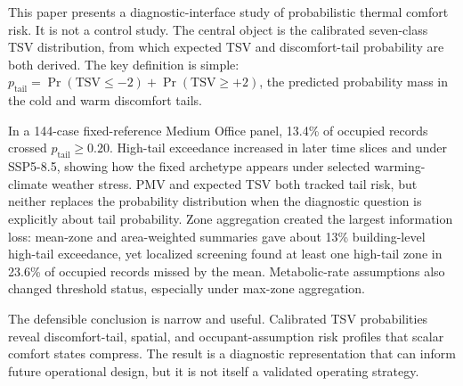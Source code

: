 This paper presents a diagnostic-interface study of probabilistic thermal comfort risk. It is not a control study. The central object is the calibrated seven-class TSV distribution, from which expected TSV and discomfort-tail probability are both derived. The key definition is simple: $p_{\mathrm{tail}}=\Pr(\mathrm{TSV}\le-2)+\Pr(\mathrm{TSV}\ge+2)$, the predicted probability mass in the cold and warm discomfort tails.

In a 144-case fixed-reference Medium Office panel, 13.4\% of occupied records crossed $p_{\mathrm{tail}}\ge0.20$. High-tail exceedance increased in later time slices and under SSP5-8.5, showing how the fixed archetype appears under selected warming-climate weather stress. PMV and expected TSV both tracked tail risk, but neither replaces the probability distribution when the diagnostic question is explicitly about tail probability. Zone aggregation created the largest information loss: mean-zone and area-weighted summaries gave about 13\% building-level high-tail exceedance, yet localized screening found at least one high-tail zone in 23.6\% of occupied records missed by the mean. Metabolic-rate assumptions also changed threshold status, especially under max-zone aggregation.

The defensible conclusion is narrow and useful. Calibrated TSV probabilities reveal discomfort-tail, spatial, and occupant-assumption risk profiles that scalar comfort states compress. The result is a diagnostic representation that can inform future operational design, but it is not itself a validated operating strategy.
